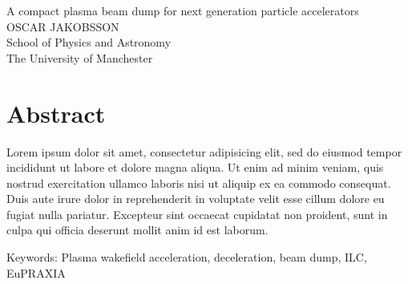 A compact plasma beam dump for next generation particle accelerators \\
OSCAR JAKOBSSON\\
School of Physics and Astronomy\\
The University of Manchester \setlength{\parskip}{0.5cm}

\thispagestyle{plain}			%
\setlength{\parskip}{0pt plus 1.0pt}
\section*{Abstract}
Lorem ipsum dolor sit amet, consectetur adipisicing elit, sed do eiusmod tempor incididunt ut labore et dolore magna aliqua. Ut enim ad minim veniam, quis nostrud exercitation ullamco laboris nisi ut aliquip ex ea commodo consequat. Duis aute irure dolor in reprehenderit in voluptate velit esse cillum dolore eu fugiat nulla pariatur. Excepteur sint occaecat cupidatat non proident, sunt in culpa qui officia deserunt mollit anim id est laborum.

\vfill
Keywords: Plasma wakefield acceleration, deceleration, beam dump, ILC, EuPRAXIA

\newpage				%
\thispagestyle{empty}
\mbox{}